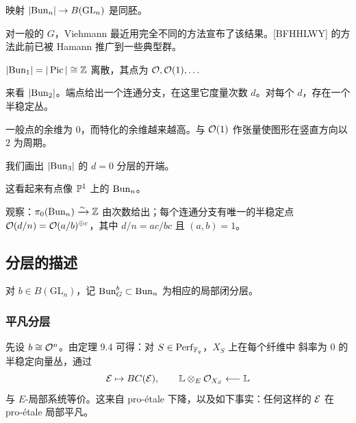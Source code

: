 \begin{theorem}[{[BFHHLWY]}]
映射 $|\mathrm{Bun}_n|\to B(\mathrm{GL}_n)$ 是同胚。
\end{theorem}

\begin{remark}
对一般的 $G$，Viehmann 最近用完全不同的方法宣布了该结果。[BFHHLWY] 的方法此前已被
Hamann 推广到一些典型群。
\end{remark}

\begin{example}
$|\mathrm{Bun}_1|=|\operatorname{Pic}|\cong\mathbb{Z}$ 离散，其点为 $\mathcal{O},\mathcal{O}(1),\dots$
\begin{center}
\end{center}
\end{example}

\begin{example}
来看 $|\mathrm{Bun}_2|$。端点给出一个连通分支，在这里它度量次数 $d$。对每个 $d$，存在一个
半稳定丛。
\begin{center}
\end{center}
一般点的余维为 $0$，而特化的余维越来越高。与 $\mathcal{O}(1)$ 作张量使图形在竖直方向以 $2$
为周期。
\end{example}

\begin{example}
我们画出 $|\mathrm{Bun}_3|$ 的 $d=0$ 分层的开端。
\begin{center}
\end{center}
\end{example}

\begin{remark}
这看起来有点像 $\mathbb{P}^1$ 上的 $\mathrm{Bun}_n$。
\end{remark}

观察：$\pi_0(\mathrm{Bun}_n)\xrightarrow{\sim}\mathbb{Z}$ 由次数给出；每个连通分支有唯一的半稳定点
$\mathcal{O}(d/n)=\mathcal{O}(a/b)^{\oplus c}$，其中 $d/n=ac/bc$ 且 $(a,b)=1$。

\subsection{分层的描述}

对 $b\in B(\mathrm{GL}_n)$，记 $\mathrm{Bun}^b_G\subset\mathrm{Bun}_n$ 为相应的局部闭分层。

\subsubsection{平凡分层}

先设 $b\cong\mathcal{O}^n$。由定理 9.4 可得：对 $S\in\mathrm{Perf}_{\mathbb{F}_q}$，$X_S$ 上在每个纤维中
斜率为 $0$ 的半稳定向量丛，通过
\[
\mathcal{E}\mapsto BC(\mathcal{E}),\qquad \mathbb{L}\otimes_E\mathcal{O}_{X_S}\longleftarrow\mathbb{L}
\]
与 $E$-局部系统等价。这来自 pro-étale 下降，以及如下事实：任何这样的 $\mathcal{E}$ 在
pro-étale 局部平凡。

